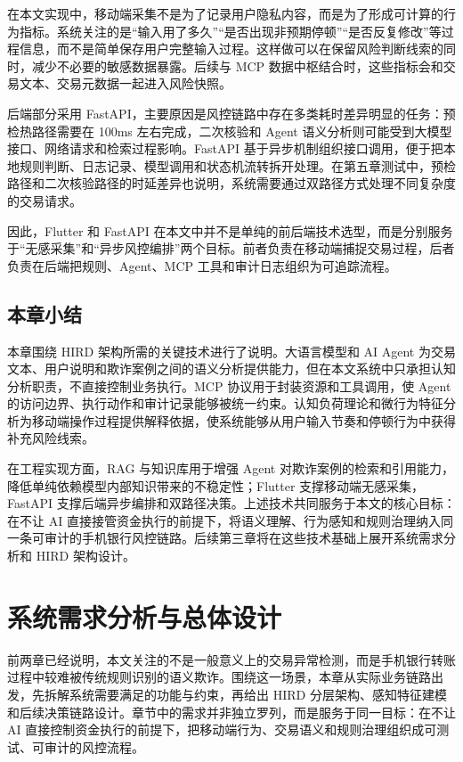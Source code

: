 \documentclass{xduugthesis}
\begin{document}
在本文实现中，移动端采集不是为了记录用户隐私内容，而是为了形成可计算的行为指标。系统关注的是“输入用了多久”“是否出现非预期停顿”“是否反复修改”等过程信息，而不是简单保存用户完整输入过程。这样做可以在保留风险判断线索的同时，减少不必要的敏感数据暴露。后续与 MCP 数据中枢结合时，这些指标会和交易文本、交易元数据一起进入风险快照。

后端部分采用 FastAPI，主要原因是风控链路中存在多类耗时差异明显的任务：预检热路径需要在 100ms 左右完成，二次核验和 Agent 语义分析则可能受到大模型接口、网络请求和检索过程影响。FastAPI 基于异步机制组织接口调用，便于把本地规则判断、日志记录、模型调用和状态机流转拆开处理。在第五章测试中，预检路径和二次核验路径的时延差异也说明，系统需要通过双路径方式处理不同复杂度的交易请求。

因此，Flutter 和 FastAPI 在本文中并不是单纯的前后端技术选型，而是分别服务于“无感采集”和“异步风控编排”两个目标。前者负责在移动端捕捉交易过程，后者负责在后端把规则、Agent、MCP 工具和审计日志组织为可追踪流程。

\section{本章小结}
本章围绕 HIRD 架构所需的关键技术进行了说明。大语言模型和 AI Agent 为交易文本、用户说明和欺诈案例之间的语义分析提供能力，但在本文系统中只承担认知分析职责，不直接控制业务执行。MCP 协议用于封装资源和工具调用，使 Agent 的访问边界、执行动作和审计记录能够被统一约束。认知负荷理论和微行为特征分析为移动端操作过程提供解释依据，使系统能够从用户输入节奏和停顿行为中获得补充风险线索。

在工程实现方面，RAG 与知识库用于增强 Agent 对欺诈案例的检索和引用能力，降低单纯依赖模型内部知识带来的不稳定性；Flutter 支撑移动端无感采集，FastAPI 支撑后端异步编排和双路径决策。上述技术共同服务于本文的核心目标：在不让 AI 直接接管资金执行的前提下，将语义理解、行为感知和规则治理纳入同一条可审计的手机银行风控链路。后续第三章将在这些技术基础上展开系统需求分析和 HIRD 架构设计。

\chapter{系统需求分析与总体设计}

前两章已经说明，本文关注的不是一般意义上的交易异常检测，而是手机银行转账过程中较难被传统规则识别的语义欺诈。围绕这一场景，本章从实际业务链路出发，先拆解系统需要满足的功能与约束，再给出 HIRD 分层架构、感知特征建模和后续决策链路设计。章节中的需求并非独立罗列，而是服务于同一目标：在不让 AI 直接控制资金执行的前提下，把移动端行为、交易语义和规则治理组织成可测试、可审计的风控流程。
\end{document}
